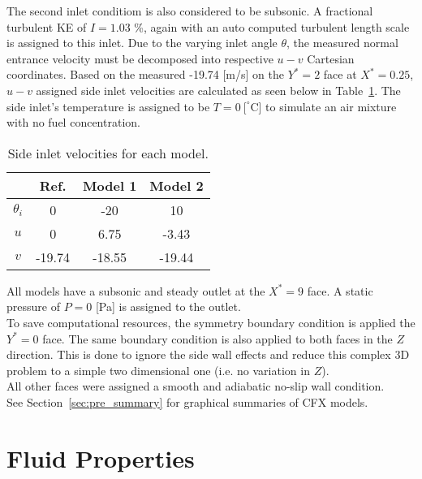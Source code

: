 The second inlet conditiom is also considered to be subsonic. A fractional turbulent KE of $I=1.03$ \%, again with an auto computed turbulent length scale \cite{projfaq} is assigned to this inlet. Due to the varying inlet angle $\theta$, the measured normal entrance velocity must be decomposed into respective $u-v$ Cartesian coordinates. Based on the measured -19.74 [m/s] on the $Y^*=2$ face at $X^*=0.25$, $u-v$ assigned side inlet velocities are calculated as seen below in Table~\ref{tab:sideinletbc}. The side inlet's temperature is assigned to be $T=0\ [ ^{\circ}$C] to simulate an air mixture with no fuel concentration.
 
\begin{table}[H]
	\centering
	\caption{Side inlet velocities for each model.}
	\begin{tabular}{cccc}
		\toprule		
		\multicolumn{1}{c}{} & \textbf{Ref.} & \textbf{Model 1} & \textbf{ Model 2} \\
		\midrule
		$\theta_i$	& 0            & -20             & 10		\\
		$u$			& 0            & 6.75            & -3.43	\\
		$v$ 		& -19.74       & -18.55          & -19.44	\\
		\bottomrule
	\end{tabular}
	\label{tab:sideinletbc}
\end{table}

All models have a subsonic and steady outlet at the $X^*=9$ face. A static pressure of $P=0$ [Pa] is assigned to the outlet.\\

To save computational resources, the symmetry boundary condition is applied the $Y^*=0$ face. The same boundary condition is also applied to both faces in the $Z$ direction. This is done to ignore the side wall effects and reduce this complex 3D problem to a simple two dimensional one (i.e. no variation in $Z$).\\

All other faces were assigned a smooth and adiabatic no-slip wall condition. \\

See Section~\ref{sec:pre_summary} for graphical summaries of CFX models.
\section{Fluid Properties}
\label{sec:pre_fluid}

